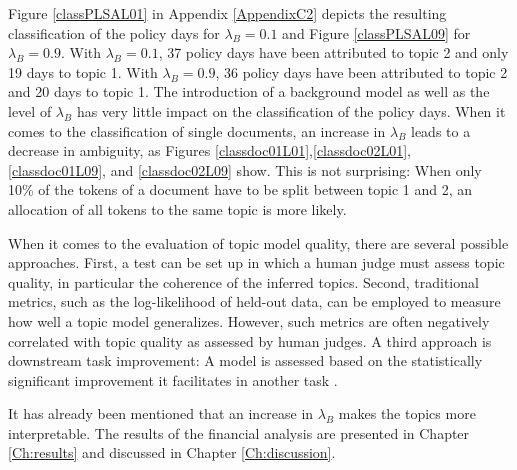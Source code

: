 \documentclass[11pt,a4paper,english,oneside]{book}
\numberwithin{equation}{chapter}
\begin{document}
Figure \ref{classPLSAL01} in Appendix \ref{AppendixC2} depicts the resulting classification of the policy days for $\lambda_B=0.1$ and Figure \ref{classPLSAL09} for $\lambda_B=0.9$. With $\lambda_B=0.1$, 37 policy days have been attributed to topic 2 and only 19 days to topic 1. With  $\lambda_B=0.9$,  36 policy days have been attributed to topic 2 and 20 days to topic 1. The introduction of a background model as well as the level of $\lambda_B$ has very little impact on the classification of the policy days. When it comes to the classification of single documents, an increase in $\lambda_B$ leads to a decrease in ambiguity, as Figures \ref{classdoc01L01},\ref{classdoc02L01}, \ref{classdoc01L09}, and \ref{classdoc02L09} show. This is not surprising: When only 10\% of the tokens of a document have to be split between topic 1 and 2, an allocation of all tokens to the same topic is more likely.


When it comes to the evaluation of topic model quality, there are several possible approaches. First, a test can be set up in which a human judge must assess topic quality, in particular the coherence of the inferred topics. Second, traditional metrics, such as the log-likelihood of held-out data, can be employed to measure how well a topic model generalizes. However, such metrics are often negatively correlated with topic quality as assessed by human judges. A third approach is downstream task improvement: A model is assessed based on the statistically significant improvement it facilitates in another task \cite[~pp.383--384]{Zhai.2016}.

It has already been mentioned that an increase in $\lambda_B$ makes the topics more interpretable. The results of the financial analysis are presented in Chapter \ref{Ch:results} and discussed in Chapter \ref{Ch:discussion}. 
\end{document}
